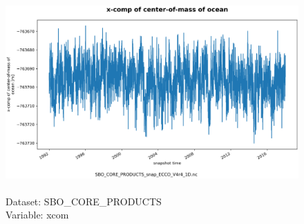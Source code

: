 \begin{figure}[H]
\centering
\includegraphics[scale=0.5]{../images/plots/oneD_plots/SBO_Core_Products/xcom.png}
\caption{\\Dataset: SBO\_CORE\_PRODUCTS\\Variable: xcom}
\label{tab:table-SBO_CORE_PRODUCTS_xcom-Plot}
\end{figure}
\pagebreak
